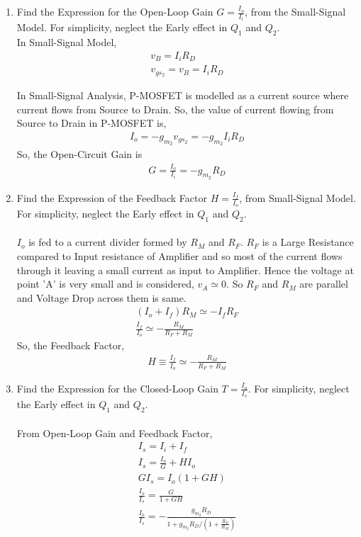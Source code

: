 \begin{enumerate}[label=\thesubsection.\arabic*.,ref=\thesubsection.\theenumi]
\item Find the Expression for the Open-Loop Gain $G=\frac{I_{o}}{I_{i}}$, from the Small-Signal Model. For simplicity, neglect the Early effect in $Q_{1}$ and $Q_{2}$.\\
\solution
In Small-Signal Model,
\begin{align}
v_{B} = I_{i}R_{D}\\
v_{gs_{2}} = v_{B} = I_{i}R_{D}
\end{align}

In Small-Signal Analysis, P-MOSFET is modelled as a current source where current flows from Source to Drain. So, the value of current flowing from Source to Drain in P-MOSFET is,
\begin{align}
I_{o} =  -g_{m_{2}}v_{gs_{2}} = -g_{m_{2}}I_{i}R_{D}
\end{align}
So, the Open-Circuit Gain is
\begin{align}
G = \frac{I_{o}}{I_{i}} =  -g_{m_{2}}R_{D}
\end{align}

\item Find the Expression of the Feedback Factor $H = \frac{I_{f}}{I_{o}}$, from Small-Signal Model. For simplicity, neglect the Early effect in $Q_{1}$ and $Q_{2}$.\\
\solution\\
$I_{o}$ is fed to a current divider formed by $R_{M}$ and $R_{F}$.
$R_{F}$ is a Large Resistance compared to Input resistance of Amplifier and so most of the current flows through it leaving a small current as input to Amplifier. Hence the voltage at point 'A' is very small and is considered, $v_{A} \simeq 0$. So $R_{F}$ and $R_{M}$ are parallel and Voltage Drop across them is same.
\begin{align}
(I_{o} + I_{f})R_{M} \simeq -I_{f}R_{F}\\
\frac{I_{f}}{I_{o}} \simeq -\frac{R_{M}}{R_{F}+R_{M}}
\end{align}
So, the Feedback Factor,
\begin{align}
H \equiv \frac{I_{f}}{I_{o}} \simeq-\frac{R_{M}}{R_{F}+R_{M}}
\end{align}
\item Find the Expression for the Closed-Loop Gain $T=\frac{I_{o}}{I_{s}}$. For simplicity, neglect the Early effect in $Q_{1}$ and $Q_{2}$.\\
\solution \\
From Open-Loop Gain and Feedback Factor,
\begin{align}
I_{s} = I_{i} + I_{f}\\
I_{s} = \frac{I_{o}}{G} + H I_{o}\\
GI_{s} = I_{o}(1+GH)\\
\frac{I_{o}}{I_{s}} = \frac{G}{1+GH}\\
\frac{I_{o}}{I_{s}}=-\frac{g_{m_{2}} R_{D}}{1+g_{m_{2}} R_{D} /\left(1+\frac{R_{F}}{R_{M}}\right)}
\end{align}


\end{enumerate}
